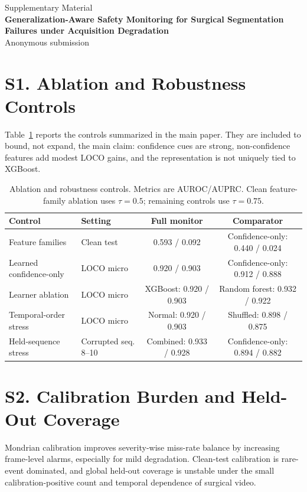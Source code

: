 \documentclass[9pt]{article}
\begin{document}
\begin{center}
{\Large Supplementary Material}\\[2pt]
{\bf Generalization-Aware Safety Monitoring for Surgical Segmentation Failures under Acquisition Degradation}\\[2pt]
Anonymous submission
\end{center}

\section*{S1. Ablation and Robustness Controls}

Table~\ref{tab:supp_controls} reports the controls summarized in the main paper.
They are included to bound, not expand, the main claim: confidence cues are
strong, non-confidence features add modest LOCO gains, and the representation is
not uniquely tied to XGBoost.

\begin{table}[h]
\centering
\scriptsize
\setlength{\tabcolsep}{3pt}
\caption{Ablation and robustness controls. Metrics are AUROC/AUPRC. Clean
feature-family ablation uses $\tau=0.5$; remaining controls use $\tau=0.75$.}
\label{tab:supp_controls}
\begin{tabular}{llcc}
\toprule
Control & Setting & Full monitor & Comparator \\
\midrule
Feature families & Clean test & 0.593 / 0.092 & Confidence-only: 0.440 / 0.024 \\
Learned confidence-only & LOCO micro & 0.920 / 0.903 & Confidence-only: 0.912 / 0.888 \\
Learner ablation & LOCO micro & XGBoost: 0.920 / 0.903 & Random forest: 0.932 / 0.922 \\
Temporal-order stress & LOCO micro & Normal: 0.920 / 0.903 & Shuffled: 0.898 / 0.875 \\
Held-sequence stress & Corrupted seq. 8--10 & Combined: 0.933 / 0.928 & Confidence-only: 0.894 / 0.882 \\
\bottomrule
\end{tabular}
\end{table}

\section*{S2. Calibration Burden and Held-Out Coverage}

Mondrian calibration improves severity-wise miss-rate balance by increasing
frame-level alarms, especially for mild degradation. Clean-test calibration is
rare-event dominated, and global held-out coverage is unstable under the small
calibration-positive count and temporal dependence of surgical video.
\end{document}
